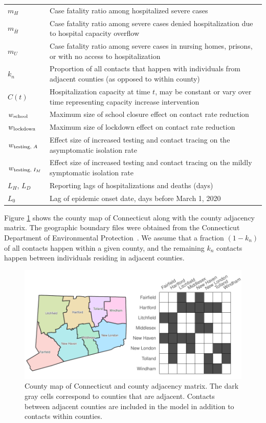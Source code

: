 \documentclass[11pt]{article}
\begin{document}
\begin{table}[!htb]
\begin{tabular}{p{} p{} }
	$m_H$ & Case fatality ratio among hospitalized severe cases \\[0.5em]
	$m_{\bar{H}}$ & Case fatality ratio among severe cases denied hospitalization due to hospital capacity overflow \\[0.5em]
	$m_{U}$ & Case fatality ratio among severe cases in nursing homes, prisons, or with no access to hospitalization \\[0.5em]
	$k_n$ & Proportion of all contacts that happen with individuals from adjacent counties (as opposed to within county) \\[0.5em]
	$C(t)$ & Hospitalization capacity at time $t$, may be constant or vary over time representing capacity increase intervention \\[0.5em]
	$w\textsubscript{school}$ & Maximum size of school closure effect on contact rate reduction \\[0.5em]
	$w\textsubscript{lockdown}$ & Maximum size of lockdown effect on contact rate reduction \\[0.5em]
	$w\textsubscript{testing, $A$}$ & Effect size of increased testing and contact tracing on the asymptomatic isolation rate  \\[0.5em]
	$w\textsubscript{testing, $I_M$}$ & Effect size of increased testing and contact tracing on the mildly symptomatic isolation rate \\[0.5em]
	$L_H$, $L_D$ & Reporting lags of hospitalizations and deaths (days) \\[0.5em]
	$L_0$ & Lag of epidemic onset date, days before March 1, 2020 \\[0.5em]
	\bottomrule
	\end{tabular}
	\label{table:params}
\end{table}
\endgroup

Figure \ref{fig:map} shows the county map of Connecticut along with the county adjacency matrix. The geographic boundary files were obtained from the Connecticut Department of Environmental Protection~\citep{shapefile}. We assume that a fraction $(1-k_n)$ of all contacts happen within a given county, and the remaining $k_n$ contacts happen between individuals residing in adjacent counties.

\begin{figure} %
	\centering
	\includegraphics[width=.7\textwidth]{figures/map_adj.pdf}
	\caption{County map of Connecticut and county adjacency matrix. The dark gray cells correspond to counties that are adjacent. Contacts between adjacent counties are included in the model in addition to contacts within counties.}
	\label{fig:map}
\end{figure}
\end{document}
